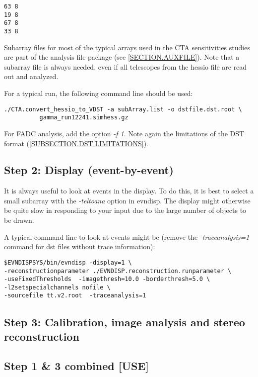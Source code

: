 \documentclass[titlepage,a4paper,twoside,11pt]{report}
\begin{document}
\begin{lstlisting}
63 8
19 8
67 8
33 8
\end{lstlisting}

Subarray files for most of the typical arrays used in the CTA sensitivities studies are part of the analysis file package 
(see \ref{SECTION.AUXFILE}). Note that a subarray file is always needed, even if all telescopes from the hessio file are read out and analyzed.

For a typical run, the following command line should be used:

\begin{lstlisting}
./CTA.convert_hessio_to_VDST -a subArray.list -o dstfile.dst.root \ 
          gamma_run12241.simhess.gz  
\end{lstlisting}

For FADC analysis, add the option {\it -f 1}. Note again the limitations of the DST format (\ref{SUBSECTION.DST.LIMITATIONS}).


\subsection{Step 2: Display (event-by-event)}

It is always useful to look at events in the display. 
To do this, it is best to select a small subarray with the {\it -teltoana} option in evndisp.
The display might otherwise be quite slow in responding to your input due to the large number of objects to be drawn.

A typical command line to look at events might be (remove the {\it -traceanalysis=1} command for dst files without trace information):

\begin{lstlisting}
$EVNDISPSYS/bin/evndisp -display=1 \
-reconstructionparameter ./EVNDISP.reconstruction.runparameter \
-useFixedThresholds  -imagethresh=10.0 -borderthresh=5.0 \
-l2setspecialchannels nofile \
-sourcefile tt.v2.root  -traceanalysis=1
\end{lstlisting}

\subsection{Step 3: Calibration, image analysis and stereo reconstruction}

\subsection{Step 1 \& 3 combined [USE]}
\end{document}
